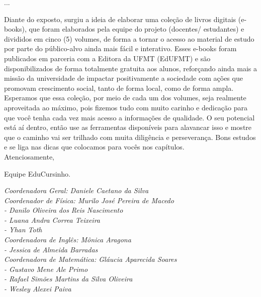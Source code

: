 {...

Diante do exposto, surgiu a ideia de elaborar uma coleção de livros 
digitais (e-books), que foram elaborados pela equipe do projeto (docentes/
estudantes) e divididos em cinco (5) volumes, de forma a tornar o acesso 
ao material de estudo por parte do público-alvo ainda mais fácil e 
interativo. Esses e-books foram publicados em parceria com a Editora da 
UFMT (EdUFMT) e são disponibilizados de forma totalmente gratuita aos 
alunos, reforçando ainda mais a missão da universidade de impactar 
positivamente a sociedade com ações que promovam crescimento social, tanto 
de forma local, como de forma ampla.\\ 

Esperamos que essa coleção, por meio de cada um dos volumes, seja 
realmente aproveitada ao máximo, pois fizemos tudo com muito carinho e 
dedicação para que você tenha cada vez mais acesso a informações de 
qualidade. O seu potencial está aí dentro, então use as ferramentas 
disponíveis para alavancar isso e mostre que o caminho vai ser trilhado 
com muita diligência e perseverança. Bons estudos e se liga nas dicas que 
colocamos para vocês nos capítulos.\\

\noindent
Atenciosamente,

\hspace*{\fill} Equipe EduCursinho.


\vfill
\noindent
\textit{Coordenadora Geral: Daniele Caetano da Silva}\\

\noindent
\textit{Coordenador de Física: Murilo José Pereira de Macedo}\\
\textit{- Danilo Oliveira dos Reis Nascimento}\\
\textit{- Luana Andra Correa Teixeira}\\
\textit{- Yhan Toth}\\

\noindent
\textit{Coordenadora de Inglês: Mônica Aragona}\\
\textit{- Jessica de Almeida Barradas}\\   

\noindent
\textit{Coordenadora de Matemática: Gláucia Aparecida Soares}\\
\textit{- Gustavo Mene Ale Primo}\\
\textit{- Rafael Simões Martins da Silva Oliveira}\\
\textit{- Wesley Alexei Paiva}\\

}
